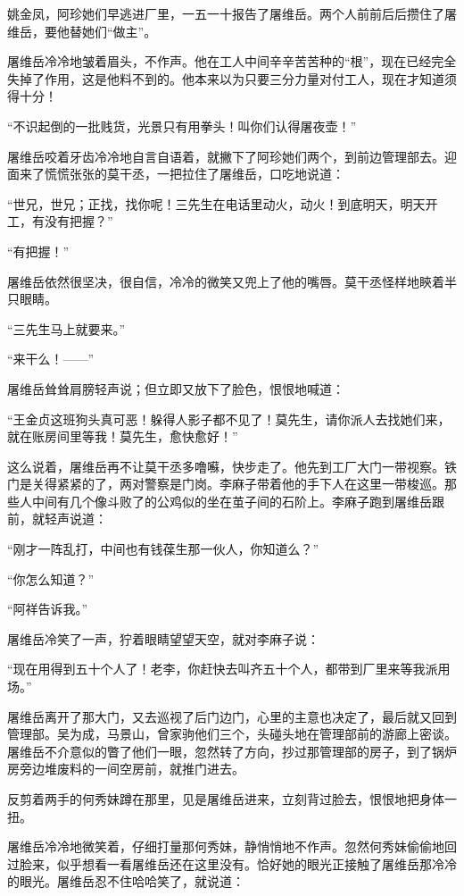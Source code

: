\par 姚金凤，阿珍她们早逃进厂里，一五一十报告了屠维岳。两个人前前后后攒住了屠维岳，要他替她们“做主”。
\par 屠维岳冷冷地皱着眉头，不作声。他在工人中间辛辛苦苦种的“根”，现在已经完全失掉了作用，这是他料不到的。他本来以为只要三分力量对付工人，现在才知道须得十分！
\par “不识起倒的一批贱货，光景只有用拳头！叫你们认得屠夜壶！”
\par 屠维岳咬着牙齿冷冷地自言自语着，就撇下了阿珍她们两个，到前边管理部去。迎面来了慌慌张张的莫干丞，一把拉住了屠维岳，口吃地说道：
\par “世兄，世兄；正找，找你呢！三先生在电话里动火，动火！到底明天，明天开工，有没有把握？”
\par “有把握！”
\par 屠维岳依然很坚决，很自信，冷冷的微笑又兜上了他的嘴唇。莫干丞怪样地鿃着半只眼睛。
\par “三先生马上就要来。”
\par “来干么！——”
\par 屠维岳耸耸肩膀轻声说；但立即又放下了脸色，恨恨地喊道：
\par “王金贞这班狗头真可恶！躲得人影子都不见了！莫先生，请你派人去找她们来，就在账房间里等我！莫先生，愈快愈好！”
\par 这么说着，屠维岳再不让莫干丞多噜囌，快步走了。他先到工厂大门一带视察。铁门是关得紧紧的了，两对警察是门岗。李麻子带着他的手下人在这里一带梭巡。那些人中间有几个像斗败了的公鸡似的坐在茧子间的石阶上。李麻子跑到屠维岳跟前，就轻声说道：
\par “刚才一阵乱打，中间也有钱葆生那一伙人，你知道么？”
\par “你怎么知道？”
\par “阿祥告诉我。”
\par 屠维岳冷笑了一声，狞着眼睛望望天空，就对李麻子说：
\par “现在用得到五十个人了！老李，你赶快去叫齐五十个人，都带到厂里来等我派用场。”
\par 屠维岳离开了那大门，又去巡视了后门边门，心里的主意也决定了，最后就又回到管理部。吴为成，马景山，曾家驹他们三个，头碰头地在管理部前的游廊上密谈。屠维岳不介意似的瞥了他们一眼，忽然转了方向，抄过那管理部的房子，到了锅炉房旁边堆废料的一间空房前，就推门进去。
\par 反剪着两手的何秀妹蹲在那里，见是屠维岳进来，立刻背过脸去，恨恨地把身体一扭。
\par 屠维岳冷冷地微笑着，仔细打量那何秀妹，静悄悄地不作声。忽然何秀妹偷偷地回过脸来，似乎想看一看屠维岳还在这里没有。恰好她的眼光正接触了屠维岳那冷冷的眼光。屠维岳忍不住哈哈笑了，就说道：
